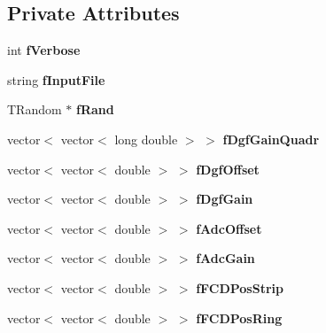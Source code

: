 \subsection*{Private Attributes}
\begin{DoxyCompactItemize}
\item 
\mbox{\label{class_calibration_a96000e6eb797044f6f1953c057e85003}} 
int {\bfseries f\+Verbose}
\item 
\mbox{\label{class_calibration_a5072ba7d40908bb42829ff655b94abbe}} 
string {\bfseries f\+Input\+File}
\item 
\mbox{\label{class_calibration_ac2ea5e39b43d6cfd913a75b2bf97ce9b}} 
T\+Random $\ast$ {\bfseries f\+Rand}
\item 
\mbox{\label{class_calibration_a7581e622bc7cc336e1c328335c7580dc}} 
vector$<$ vector$<$ long double $>$ $>$ {\bfseries f\+Dgf\+Gain\+Quadr}
\item 
\mbox{\label{class_calibration_ada08b4d5b7debaade1f0253c37246a91}} 
vector$<$ vector$<$ double $>$ $>$ {\bfseries f\+Dgf\+Offset}
\item 
\mbox{\label{class_calibration_a85ccd2f929fa2868b82fe24f492dface}} 
vector$<$ vector$<$ double $>$ $>$ {\bfseries f\+Dgf\+Gain}
\item 
\mbox{\label{class_calibration_ace07432ae8989b8309754d84a9d7e91e}} 
vector$<$ vector$<$ double $>$ $>$ {\bfseries f\+Adc\+Offset}
\item 
\mbox{\label{class_calibration_a0ee2c053390f1400db656aeed6d609ce}} 
vector$<$ vector$<$ double $>$ $>$ {\bfseries f\+Adc\+Gain}
\item 
\mbox{\label{class_calibration_aa180b606b811ac4bd8a2db517c5302a3}} 
vector$<$ vector$<$ double $>$ $>$ {\bfseries f\+F\+C\+D\+Pos\+Strip}
\item 
\mbox{\label{class_calibration_ac2f692c5e54aed9d508e63db2439855f}} 
vector$<$ vector$<$ double $>$ $>$ {\bfseries f\+F\+C\+D\+Pos\+Ring}

\end{DoxyCompactItemize}
